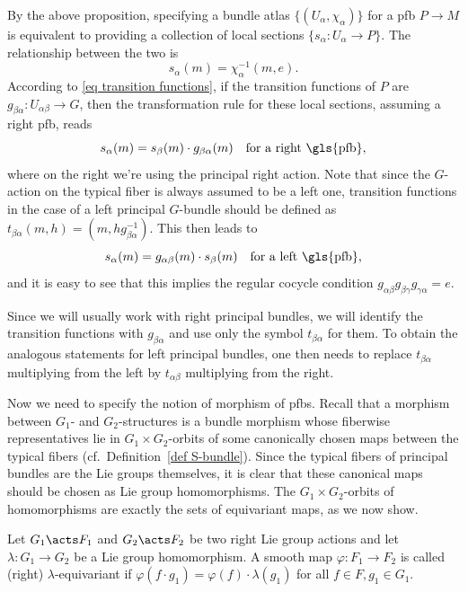 \begin{rem}
    By the above proposition, specifying a bundle atlas $\{(U_\alpha,\chi_\alpha)\}$ for a \gls{pfb} $P\to M$ is equivalent to providing a collection of local sections $\{s_\alpha:U_\alpha\to P\}$. The relationship between the two is 
    \[s_\alpha(m)=\chi_\alpha^{-1}(m,e).\]
    According to \eqref{eq transition functions}, if the transition functions of $P$ are $g_{\beta\alpha}:U_{\alpha\beta}\to G$, then the transformation rule for these local sections, assuming a right \gls{pfb}, reads 
    \[s_\alpha(m)=s_\beta(m)\cdot g_{\beta\alpha}(m)\quad \text{for a right \gls{pfb}},\label{eq transf rule for sections}\]
    where on the right we're using the principal right action. Note that since the $G$-action on the typical fiber is always assumed to be a left one, transition functions in the case of a left principal $G$-bundle should be defined as $t_{\beta\alpha}(m,h)=(m,hg_{\beta\alpha}^{-1})$. This then leads to 
    \[s_\alpha(m)=g_{\alpha\beta}(m) \cdot s_\beta(m) \quad \text{for a left \gls{pfb}},\]
    and it is easy to see that this implies the regular cocycle condition $g_{\alpha\beta}g_{\beta\gamma}g_{\gamma\alpha}=e$.

    Since we will usually work with right principal bundles, we will identify the transition functions with $g_{\beta\alpha}$ and use only the symbol $t_{\beta\alpha}$ for them. To obtain the analogous statements for left principal bundles, one then needs to replace $t_{\beta\alpha}$ multiplying from the left by $t_{\alpha\beta}$ multiplying from the right.
\end{rem}

Now we need to specify the notion of morphism of \glspl{pfb}. Recall that a morphism between $G_1$- and $G_2$-structures is a bundle morphism whose fiberwise representatives lie in $G_1\times G_2$-orbits of some canonically chosen maps between the typical fibers (cf.\ Definition~\ref{def S-bundle}). Since the typical fibers of principal bundles are the Lie groups themselves, it is clear that these canonical maps should be chosen as Lie group homomorphisms. The $G_1\times G_2$-orbits of homomorphisms are exactly the sets of equivariant maps, as we now show. 

\begin{defn}
    Let $G_1\acts F_1$ and $G_2\acts F_2$ be two right Lie group actions and let $\lambda:G_1\to G_2$ be a Lie group homomorphism. A smooth map $\varphi:F_1\to F_2$ is called (right) $\lambda$-equivariant if $\varphi(f\cdot g_1)=\varphi(f)\cdot \lambda(g_1)$ for all $f\in F,g_1\in G_1$.
\end{defn}

